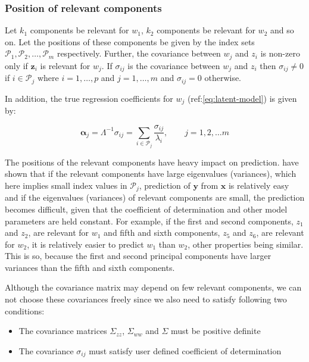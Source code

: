 \documentclass[num-refs]{wiley-article}
\providecommand{\tightlist}{%
  \setlength{\itemsep}{0pt}\setlength{\parskip}{0pt}}
\begin{document}
\subsubsection{Position of relevant
components}\label{position-of-relevant-components}

Let \(k_1\) components be relevant for \(w_1\), \(k_2\) components be
relevant for \(w_2\) and so on. Let the positions of these components be
given by the index sets
\(\mathcal{P}_1, \mathcal{P}_2, \ldots, \mathcal{P}_m\) respectively.
Further, the covariance between \(w_j\) and \(z_i\) is non-zero only if
\(\mathbf{z}_i\) is relevant for \(w_j\). If \(\sigma_{ij}\) is the
covariance between \(w_j\) and \(z_i\) then \(\sigma_{ij} \ne 0\) if
\(i \in \mathcal{P}_j\) where \(i = 1, \ldots, p\) and
\(j = 1, \ldots, m\) and \(\sigma_{ij} = 0\) otherwise.

In addition, the true regression coefficients for \(w_j\)
(ref:\eqref{eq:latent-model}) is given by:

\[
\boldsymbol{\alpha}_j = \Lambda^{-1} \sigma_{ij} = \sum_{i \in \mathcal{P}_j}\frac{\sigma_{ij}}{\lambda_i},\qquad j = 1, 2, \ldots m
\]

The positions of the relevant components have heavy impact on
prediction. \citet{helland1994comparison} have shown that if the
relevant components have large eigenvalues (variances), which here
implies small index values in \(\mathcal{P}_j\), prediction of
\(\mathbf{y}\) from \(\mathbf{x}\) is relatively easy and if the
eigenvalues (variances) of relevant components are small, the prediction
becomes difficult, given that the coefficient of determination and other
model parameters are held constant. For example, if the first and second
components, \(z_1\) and \(z_2\), are relevant for \(w_1\) and fifth and
sixth components, \(z_5\) and \(z_6\), are relevant for \(w_2\), it is
relatively easier to predict \(w_1\) than \(w_2\), other properties
being similar. This is so, because the first and second principal
components have larger variances than the fifth and sixth components.

Although the covariance matrix may depend on few relevant components, we
can not choose these covariances freely since we also need to satisfy
following two conditions:

\begin{itemize}
\tightlist
\item
  The covariance matrices \(\Sigma_{zz}\), \(\Sigma_{ww}\) and
  \(\Sigma\) must be positive definite
\item
  The covariance \(\sigma_{ij}\) must satisfy user defined coefficient
  of determination
\end{itemize}
\end{document}
